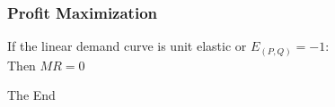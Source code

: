 \documentclass{beamer}
\begin{document}
\begin{frame}
	\frametitle{Profit Maximization}
	\begin{theorem}
		\centering
		If the linear demand curve is unit elastic or $E_{(P,Q)}= -1$:\\
		Then $MR = 0$
	\end{theorem}
\end{frame}








\begin{frame}
	\Huge{\centerline{The End}}
\end{frame}

\end{document}

